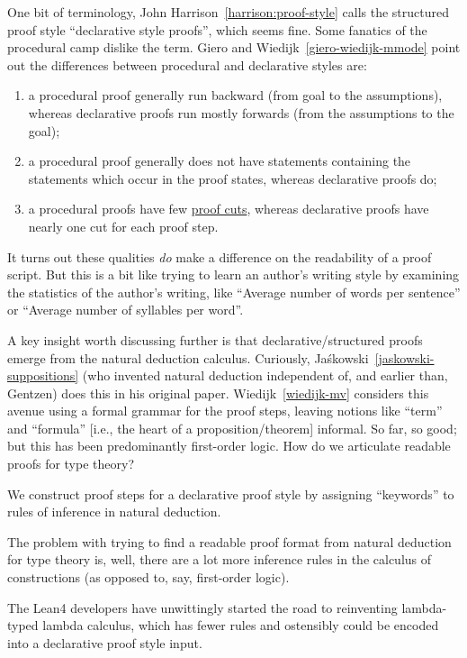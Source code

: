 One bit of terminology, John Harrison~\ref{harrison:proof-style} calls
the structured proof style ``declarative style proofs'', which seems
fine. Some fanatics of the procedural camp dislike the term. Giero and
Wiedijk~\ref{giero-wiedijk-mmode} point out the
differences between procedural and declarative styles are:
\begin{enumerate}
\item a procedural proof generally run backward (from goal to the
  assumptions), whereas declarative proofs run mostly forwards (from the
  assumptions to the goal);
\item a procedural proof generally does not have statements containing
  the statements which occur in the proof states, whereas declarative
  proofs do;
\item a procedural proofs have few \ifblog\href{https://en.wikipedia.org/wiki/Cut_rule}{proof cuts}\fi{}\fi, whereas declarative
  proofs have nearly one cut for each proof step.
\end{enumerate}
It turns out these qualities \emph{do} make a difference on the
readability of a proof script. But this is a bit like trying to learn an
author's writing style by examining the statistics of the author's
writing, like ``Average number of words per sentence'' or ``Average
number of syllables per word''.

A key insight worth discussing further is that declarative/structured
proofs emerge from the natural deduction calculus. Curiously,
Ja\'skowski~\ref{jaskowski-suppositions} (who invented natural deduction
independent of, and earlier than, Gentzen) does this in his original
paper. Wiedijk~\ref{wiedijk-mv} considers this avenue using a formal
grammar for the proof steps, leaving notions like ``term'' and
``formula'' [i.e., the heart of a proposition/theorem] informal.
So far, so good; but this has been predominantly first-order logic. How
do we articulate readable proofs for type theory?

\M
We construct proof steps for a declarative proof style by assigning
``keywords'' to rules of inference in natural deduction.

The problem with trying to find a readable proof format from natural
deduction for type theory is, well, there are a lot more inference rules
in the calculus of constructions (as opposed to, say, first-order
logic).

The Lean4 developers have unwittingly started the road to reinventing
lambda-typed lambda calculus, which has fewer rules and ostensibly could
be encoded into a declarative proof style input.

